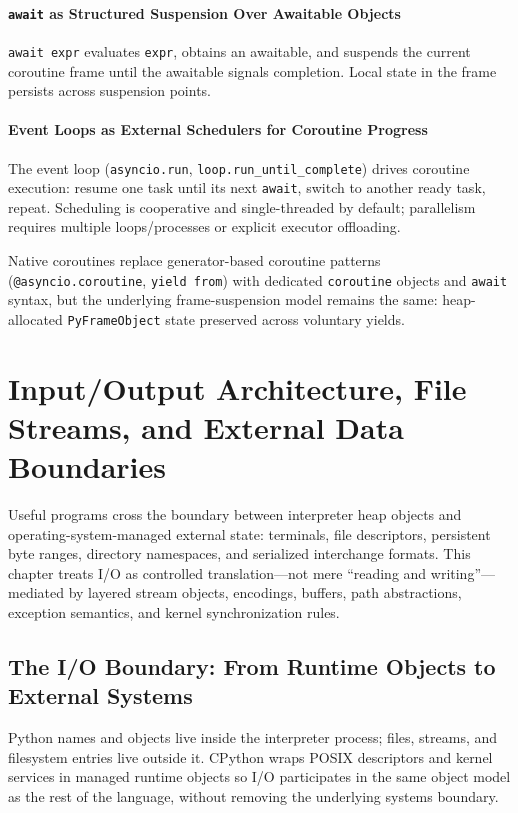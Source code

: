 \documentclass[a4paper,twoside]{report}
\begin{document}
\subsubsection{\texttt{await} as Structured Suspension Over Awaitable Objects}

\texttt{await expr} evaluates \texttt{expr}, obtains an awaitable, and suspends the current coroutine frame until the awaitable signals completion. Local state in the frame persists across suspension points.

\subsubsection{Event Loops as External Schedulers for Coroutine Progress}

The event loop (\texttt{asyncio.run}, \texttt{loop.run\_until\_complete}) drives coroutine execution: resume one task until its next \texttt{await}, switch to another ready task, repeat. Scheduling is cooperative and single-threaded by default; parallelism requires multiple loops/processes or explicit executor offloading.

Native coroutines replace generator-based coroutine patterns (\texttt{@asyncio.coroutine}, \texttt{yield from}) with dedicated \texttt{coroutine} objects and \texttt{await} syntax, but the underlying frame-suspension model remains the same: heap-allocated \texttt{PyFrameObject} state preserved across voluntary yields.


\chapter{Input/Output Architecture, File Streams, and External Data Boundaries}

Useful programs cross the boundary between interpreter heap objects and operating-system-managed external state: terminals, file descriptors, persistent byte ranges, directory namespaces, and serialized interchange formats. This chapter treats I/O as controlled translation---not mere ``reading and writing''---mediated by layered stream objects, encodings, buffers, path abstractions, exception semantics, and kernel synchronization rules.


\section{The I/O Boundary: From Runtime Objects to External Systems}

Python names and objects live inside the interpreter process; files, streams, and filesystem entries live outside it. CPython wraps POSIX descriptors and kernel services in managed runtime objects so I/O participates in the same object model as the rest of the language, without removing the underlying systems boundary.
\end{document}
